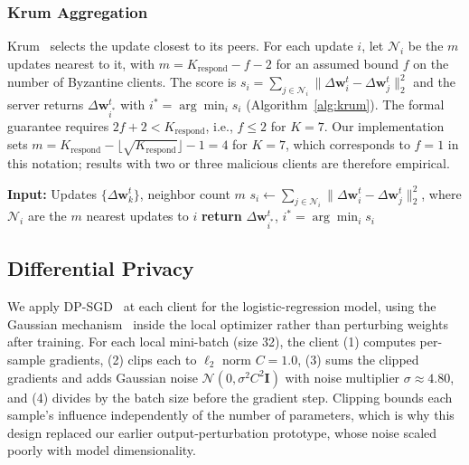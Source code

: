 \documentclass[journal]{IEEEtran}
\begin{document}
\subsubsection{Krum Aggregation}

Krum~\cite{blanchard2017machine} selects the update closest to its peers. For each update $i$, let $\mathcal{N}_i$ be the $m$ updates nearest to it, with $m = K_{\text{respond}} - f - 2$ for an assumed bound $f$ on the number of Byzantine clients. The score is $s_i = \sum_{j\in\mathcal{N}_i}\|\Delta\mathbf{w}^t_i-\Delta\mathbf{w}^t_j\|_2^2$ and the server returns $\Delta\mathbf{w}^t_{i^*}$ with $i^*=\arg\min_i s_i$ (Algorithm~\ref{alg:krum}). The formal guarantee requires $2f+2 < K_{\text{respond}}$, i.e., $f \leq 2$ for $K=7$. Our implementation sets $m = K_{\text{respond}}-\lfloor\sqrt{K_{\text{respond}}}\rfloor-1 = 4$ for $K=7$, which corresponds to $f=1$ in this notation; results with two or three malicious clients are therefore empirical.

\begin{algorithm}[t]
\caption{Krum selection}
\label{alg:krum}
\begin{algorithmic}[1]
\State \textbf{Input:} Updates $\{\Delta\mathbf{w}^t_k\}$, neighbor count $m$
  \State $s_i \gets \sum_{j \in \mathcal{N}_i} \|\Delta\mathbf{w}^t_i - \Delta\mathbf{w}^t_j\|_2^2$, where $\mathcal{N}_i$ are the $m$ nearest updates to $i$
\EndFor
\State \textbf{return} $\Delta\mathbf{w}^t_{i^*}$, $i^* = \arg\min_i s_i$
\end{algorithmic}
\end{algorithm}

\subsection{Differential Privacy}
\label{sec:dp}

We apply DP-SGD~\cite{abadi2016deep} at each client for the logistic-regression model, using the Gaussian mechanism~\cite{dwork2014algorithmic} inside the local optimizer rather than perturbing weights after training. For each local mini-batch (size 32), the client (1) computes per-sample gradients, (2) clips each to $\ell_2$ norm $C=1.0$, (3) sums the clipped gradients and adds Gaussian noise $\mathcal{N}(0,\sigma^2C^2\mathbf{I})$ with noise multiplier $\sigma\approx 4.80$, and (4) divides by the batch size before the gradient step. Clipping bounds each sample's influence independently of the number of parameters, which is why this design replaced our earlier output-perturbation prototype, whose noise scaled poorly with model dimensionality.
\end{document}
